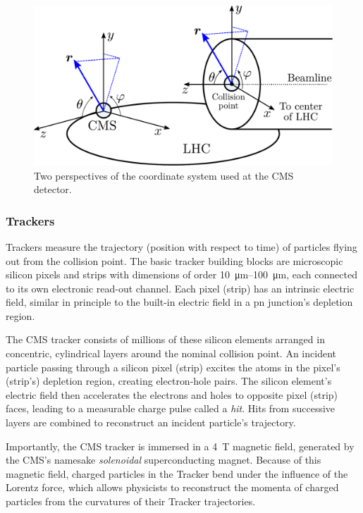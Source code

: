 \documentclass[11pt, a4paper]{article}
\begin{document}
\begin{figure}[htb!]
    \centering
    \includegraphics[width=0.9\linewidth]{vector/cms-coordinate-system.pdf}
    \caption{Two perspectives of the coordinate system used at the CMS detector.}
    \label{fig:cms-coordinate-system}
\end{figure}

\subsubsection{Trackers}
Trackers measure the trajectory (position with respect to time) of particles flying out from the collision point. The basic tracker building blocks are microscopic silicon pixels and strips with dimensions of order \SIrange{10}{100}{\micro \meter}, each connected to its own electronic read-out channel. Each pixel (strip) has an intrinsic electric field, similar in principle to the built-in electric field in a pn junction's depletion region.

The CMS tracker \cite{tracker-tdr} consists of millions of these silicon elements arranged in concentric, cylindrical layers around the nominal collision point. An incident particle passing through a silicon pixel (strip) excites the atoms in the pixel's (strip's) depletion region, creating electron-hole pairs. The silicon element's electric field then accelerates the electrons and holes to opposite pixel (strip) faces, leading to a measurable charge pulse called a \textit{hit}. Hits from successive layers are combined to reconstruct an incident particle's trajectory. 

Importantly, the CMS tracker is immersed in a \SI{4}{\tesla} magnetic field, generated by the CMS's namesake \textit{solenoidal} superconducting magnet. Because of this magnetic field, charged particles in the Tracker bend under the influence of the Lorentz force, which allows physicists to reconstruct the momenta of charged particles from the curvatures of their Tracker trajectories.
\end{document}
